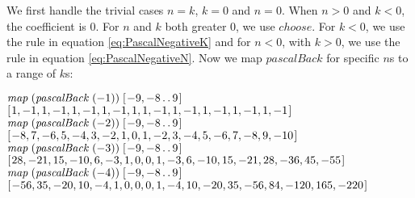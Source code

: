 \documentclass[tikz]{scrreprt}
\newcommand{\Varid}[1]{\mathit{#1}}
\begin{document}
We first handle the trivial cases
$n=k$, $k=0$ and $n=0$.
When $n > 0$ and $k < 0$, the coefficient is 0.
For $n$ and $k$ both greater 0,
we use \ensuremath{\Varid{choose}}.
For $k<0$, we use the rule in equation \ref{eq:PascalNegativeK}
and for $n<0$, with $k>0$, we use the rule in
equation \ref{eq:PascalNegativeN}.
Now we map \ensuremath{\Varid{pascalBack}} for specific $n$s to a range of $k$s:

\ensuremath{\Varid{map}\;(\Varid{pascalBack}\;(\mathbin{-}\mathrm{1}))\;[\mskip1.5mu \mathbin{-}\mathrm{9},\mathbin{-}\mathrm{8}\mathinner{\ldotp\ldotp}\mathrm{9}\mskip1.5mu]}\\
\ensuremath{[\mskip1.5mu \mathrm{1},\mathbin{-}\mathrm{1},\mathrm{1},\mathbin{-}\mathrm{1},\mathrm{1},\mathbin{-}\mathrm{1},\mathrm{1},\mathbin{-}\mathrm{1},\mathrm{1},\mathrm{1},\mathbin{-}\mathrm{1},\mathrm{1},\mathbin{-}\mathrm{1},\mathrm{1},\mathbin{-}\mathrm{1},\mathrm{1},\mathbin{-}\mathrm{1},\mathrm{1},\mathbin{-}\mathrm{1}\mskip1.5mu]}\\[12pt]
\ensuremath{\Varid{map}\;(\Varid{pascalBack}\;(\mathbin{-}\mathrm{2}))\;[\mskip1.5mu \mathbin{-}\mathrm{9},\mathbin{-}\mathrm{8}\mathinner{\ldotp\ldotp}\mathrm{9}\mskip1.5mu]}\\
\ensuremath{[\mskip1.5mu \mathbin{-}\mathrm{8},\mathrm{7},\mathbin{-}\mathrm{6},\mathrm{5},\mathbin{-}\mathrm{4},\mathrm{3},\mathbin{-}\mathrm{2},\mathrm{1},\mathrm{0},\mathrm{1},\mathbin{-}\mathrm{2},\mathrm{3},\mathbin{-}\mathrm{4},\mathrm{5},\mathbin{-}\mathrm{6},\mathrm{7},\mathbin{-}\mathrm{8},\mathrm{9},\mathbin{-}\mathrm{10}\mskip1.5mu]}\\[12pt]
\ensuremath{\Varid{map}\;(\Varid{pascalBack}\;(\mathbin{-}\mathrm{3}))\;[\mskip1.5mu \mathbin{-}\mathrm{9},\mathbin{-}\mathrm{8}\mathinner{\ldotp\ldotp}\mathrm{9}\mskip1.5mu]}\\
\ensuremath{[\mskip1.5mu \mathrm{28},\mathbin{-}\mathrm{21},\mathrm{15},\mathbin{-}\mathrm{10},\mathrm{6},\mathbin{-}\mathrm{3},\mathrm{1},\mathrm{0},\mathrm{0},\mathrm{1},\mathbin{-}\mathrm{3},\mathrm{6},\mathbin{-}\mathrm{10},\mathrm{15},\mathbin{-}\mathrm{21},\mathrm{28},\mathbin{-}\mathrm{36},\mathrm{45},\mathbin{-}\mathrm{55}\mskip1.5mu]}\\[12pt]
\ensuremath{\Varid{map}\;(\Varid{pascalBack}\;(\mathbin{-}\mathrm{4}))\;[\mskip1.5mu \mathbin{-}\mathrm{9},\mathbin{-}\mathrm{8}\mathinner{\ldotp\ldotp}\mathrm{9}\mskip1.5mu]}\\
\ensuremath{[\mskip1.5mu \mathbin{-}\mathrm{56},\mathrm{35},\mathbin{-}\mathrm{20},\mathrm{10},\mathbin{-}\mathrm{4},\mathrm{1},\mathrm{0},\mathrm{0},\mathrm{0},\mathrm{1},\mathbin{-}\mathrm{4},\mathrm{10},\mathbin{-}\mathrm{20},\mathrm{35},\mathbin{-}\mathrm{56},\mathrm{84},\mathbin{-}\mathrm{120},\mathrm{165},\mathbin{-}\mathrm{220}\mskip1.5mu]}\\[12pt]
\end{document}
